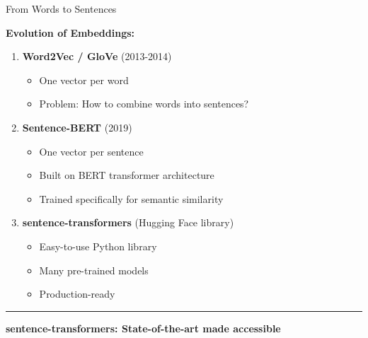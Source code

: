 \documentclass[8pt,aspectratio=169]{beamer}
\newcommand{\bottomnote}[1]{%
\vfill
\vspace{-2mm}
\textcolor{mllavender2}{\rule{\textwidth}{0.4pt}}
\vspace{1mm}
\footnotesize
\textbf{#1}
}
\begin{document}
\begin{frame}[t]{From Words to Sentences}

\textbf{Evolution of Embeddings:}

\vspace{0.5cm}

\begin{enumerate}
    \item \textbf{Word2Vec / GloVe} (2013-2014)
    \begin{itemize}
        \item One vector per word
        \item Problem: How to combine words into sentences?
    \end{itemize}

    \vspace{0.3cm}

    \item \textbf{Sentence-BERT} (2019)
    \begin{itemize}
        \item One vector per sentence
        \item Built on BERT transformer architecture
        \item Trained specifically for semantic similarity
    \end{itemize}

    \vspace{0.3cm}

    \item \textbf{sentence-transformers} (Hugging Face library)
    \begin{itemize}
        \item Easy-to-use Python library
        \item Many pre-trained models
        \item Production-ready
    \end{itemize}
\end{enumerate}

\bottomnote{sentence-transformers: State-of-the-art made accessible}
\end{frame}
\end{document}
